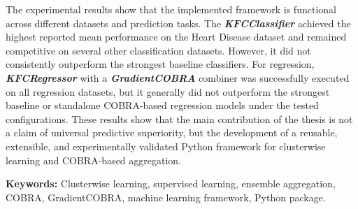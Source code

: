 The experimental results show that the implemented framework is functional across different datasets and prediction tasks. The \textbf{\textit{KFCClassifier}} achieved the highest reported mean performance on the Heart Disease dataset and remained competitive on several other classification datasets. However, it did not consistently outperform the strongest baseline classifiers. For regression, \textbf{\textit{KFCRegressor}} with a \textbf{\textit{GradientCOBRA}} combiner was successfully executed on all regression datasets, but it generally did not outperform the strongest baseline or standalone COBRA-based regression models under the tested configurations. These results show that the main contribution of the thesis is not a claim of universal predictive superiority, but the development of a reusable, extensible, and experimentally validated Python framework for clusterwise learning and COBRA-based aggregation.

\vspace{0.5cm}
\noindent\textbf{Keywords:} Clusterwise learning, supervised learning, ensemble aggregation, COBRA, GradientCOBRA, machine learning framework, Python package.
